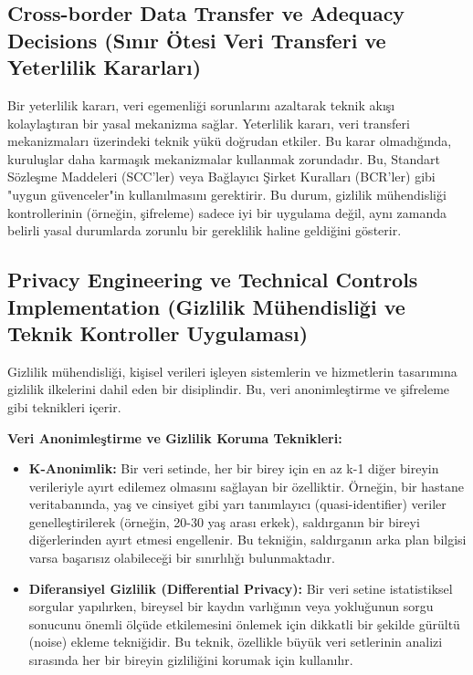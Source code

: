 \subsection{Cross-border Data Transfer ve Adequacy Decisions (Sınır Ötesi Veri Transferi ve Yeterlilik Kararları)}

Bir yeterlilik kararı, veri egemenliği sorunlarını azaltarak teknik akışı kolaylaştıran bir yasal mekanizma sağlar. Yeterlilik kararı, veri transferi mekanizmaları üzerindeki teknik yükü doğrudan etkiler. Bu karar olmadığında, kuruluşlar daha karmaşık mekanizmalar kullanmak zorundadır. Bu, Standart Sözleşme Maddeleri (SCC'ler) veya Bağlayıcı Şirket Kuralları (BCR'ler) gibi "uygun güvenceler"in kullanılmasını gerektirir. Bu durum, gizlilik mühendisliği kontrollerinin (örneğin, şifreleme) sadece iyi bir uygulama değil, aynı zamanda belirli yasal durumlarda zorunlu bir gereklilik haline geldiğini gösterir.

\subsection{Privacy Engineering ve Technical Controls Implementation (Gizlilik Mühendisliği ve Teknik Kontroller Uygulaması)}

Gizlilik mühendisliği, kişisel verileri işleyen sistemlerin ve hizmetlerin tasarımına gizlilik ilkelerini dahil eden bir disiplindir. Bu, veri anonimleştirme ve şifreleme gibi teknikleri içerir.

\textbf{Veri Anonimleştirme ve Gizlilik Koruma Teknikleri:}
\begin{itemize}
    \item \textbf{K-Anonimlik:} Bir veri setinde, her bir birey için en az k-1 diğer bireyin verileriyle ayırt edilemez olmasını sağlayan bir özelliktir. Örneğin, bir hastane veritabanında, yaş ve cinsiyet gibi yarı tanımlayıcı (quasi-identifier) veriler genelleştirilerek (örneğin, 20-30 yaş arası erkek), saldırganın bir bireyi diğerlerinden ayırt etmesi engellenir. Bu tekniğin, saldırganın arka plan bilgisi varsa başarısız olabileceği bir sınırlılığı bulunmaktadır.
    \item \textbf{Diferansiyel Gizlilik (Differential Privacy):} Bir veri setine istatistiksel sorgular yapılırken, bireysel bir kaydın varlığının veya yokluğunun sorgu sonucunu önemli ölçüde etkilemesini önlemek için dikkatli bir şekilde gürültü (noise) ekleme tekniğidir. Bu teknik, özellikle büyük veri setlerinin analizi sırasında her bir bireyin gizliliğini korumak için kullanılır.
\end{itemize}

